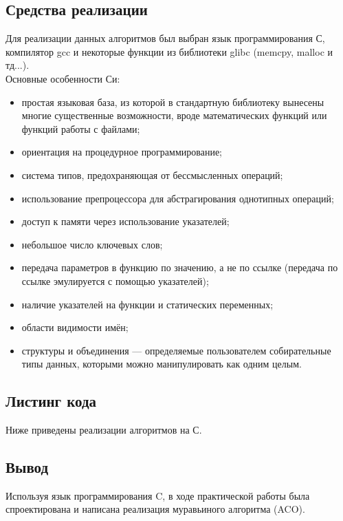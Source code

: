 \documentclass[a4paper,12pt]{article}
\begin{document}
\subsection{Средства реализации}
Для реализации данных алгоритмов был выбран язык программирования С, компилятор gcc и некоторые функции из библиотеки glibc (memcpy, malloc и тд...). \\
Основные особенности Си:
\begin{itemize}
\item простая языковая база, из которой в стандартную библиотеку вынесены многие существенные возможности, вроде математических функций или функций работы с файлами;
\item ориентация на процедурное программирование;
\item система типов, предохраняющая от бессмысленных операций;
\item использование препроцессора для абстрагирования однотипных операций;
\item доступ к памяти через использование указателей;
\item небольшое число ключевых слов;
\item передача параметров в функцию по значению, а не по ссылке (передача по ссылке эмулируется с помощью указателей);
\item наличие указателей на функции и статических переменных;
\item области видимости имён;
\item структуры и объединения — определяемые пользователем собирательные типы данных, которыми можно манипулировать как одним целым.
\end{itemize}

\newpage
\subsection{Листинг кода}
Ниже приведены реализации алгоритмов на С.\\


\newpage


\newpage
\subsection{Вывод}
Используя язык программирования C, в ходе практической работы была спроектирована и написана реализация муравьиного алгоритма (ACO).
\end{document}
